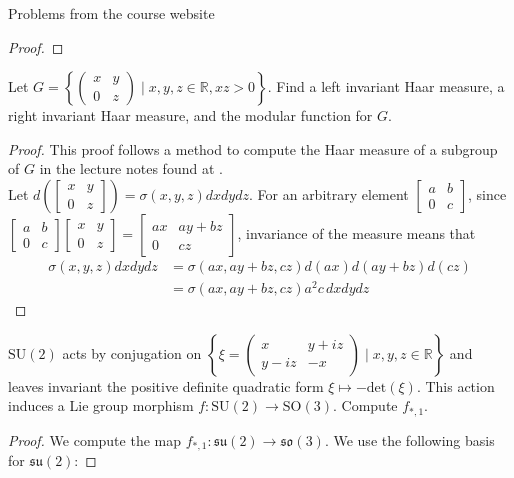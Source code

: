 \documentclass[12pt]{article}
\newcommand{\R}{\mathbb{R}}
\theoremstyle{definition}
\newenvironment{problem}[2][Problem]{\begin{trivlist}
\item[\hskip \labelsep {\bfseries #1}\hskip \labelsep {\bfseries #2.}]}{\end{trivlist}}
\begin{document}
\begin{section}{Problems from the course website}
\begin{proof}
\end{proof}
\begin{problem}{5}
	Let $G= \left\{ \begin{pmatrix}
		x&y\\0&z
\end{pmatrix} \mid x, y, z \in \R, xz > 0\right\}$. Find a left invariant Haar measure, a right invariant Haar measure, and the modular function for $G$.
\end{problem}
\begin{proof}
	This proof follows a method to compute the Haar measure of a subgroup of $G$ in the lecture notes found at \cite{jhu}. 
	\\Let $d\left( \begin{bmatrix}
		x&y\\0&z
\end{bmatrix}\right) = \sigma(x,y,z)dxdydz$. For an arbitrary element $\begin{bmatrix}
	a & b\\0 & c
\end{bmatrix}$, since $\begin{bmatrix}
	a&b\\0&c
\end{bmatrix}\begin{bmatrix}
	x&y\\0&z
\end{bmatrix} = \begin{bmatrix}
	ax & ay + bz\\0 & cz
\end{bmatrix}$, invariance of the measure means that
\begin{align*}\sigma(x,y,z)dxdydz &= \sigma(ax, ay+bz, cz)d(ax)d(ay+bz)d(cz)\\
&= \sigma(ax,ay+bz,cz)a^2c\,dxdydz\end{align*}
\end{proof}
\begin{problem}{6}
	$\text{SU}(2)$ acts by conjugation on $\left\{ \xi = \begin{pmatrix}
		x & y + iz\\y-iz & -x
\end{pmatrix} \mid x, y, z \in \R\right\}$ and leaves invariant the positive definite quadratic form $\xi \mapsto -\text{det}(\xi)$. This action induces a Lie group morphism $f : \text{SU}(2) \to \text{SO}(3)$. Compute $f_{*,1}$.
\end{problem}
\begin{proof}
	We compute the map $f_{*,1}: \mathfrak{su}(2) \to \mathfrak{so}(3)$. We use the following basis for $\mathfrak{su}(2)$:

\end{proof}
\end{section}
\end{document}
